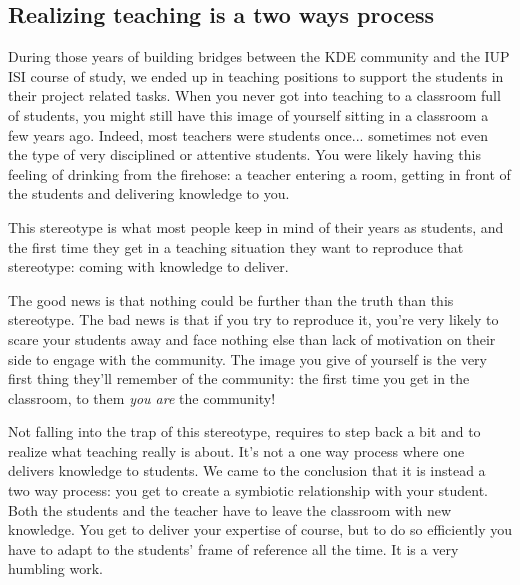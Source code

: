 \subsection*{Realizing teaching is a two ways process}
During those years of building bridges between the KDE community and the IUP ISI course of study, we ended up in teaching positions to support the students in their project related tasks. When you never got into teaching to a classroom full of students, you might still have this image of yourself sitting in a classroom a few years ago. Indeed, most teachers were students once... sometimes not even the type of very disciplined or attentive students. You were likely having this feeling of drinking from the firehose: a teacher entering a room, getting in front of the students and delivering knowledge to you.

This stereotype is what most people keep in mind of their years as students, and the first time they get in a teaching situation they want to reproduce that stereotype: coming with knowledge to deliver.

The good news is that nothing could be further than the truth than this stereotype. The bad news is that if you try to reproduce it, you're very likely to scare your students away and face nothing else than lack of motivation on their side to engage with the community. The image you give of yourself is the very first thing they'll remember of the community: the first time you get in the classroom, to them \emph{you are} the community!

Not falling into the trap of this stereotype, requires to step back a bit and to realize what teaching really is about. It's not a one way process where one delivers knowledge to students. We came to the conclusion that it is instead a two way process: you get to create a symbiotic relationship with your student. Both the students and the teacher have to leave the classroom with new knowledge. You get to deliver your expertise of course, but to do so efficiently you have to adapt to the students' frame of reference all the time. It is a very humbling work.

